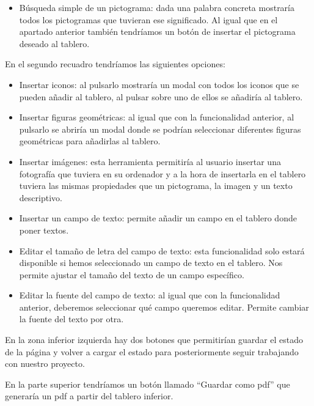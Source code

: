 \begin{itemize}
\begin{itemize}
		\item Búsqueda simple de un pictograma: dada una palabra concreta mostraría todos los pictogramas que tuvieran ese significado. Al igual que en el apartado anterior también tendríamos un botón de insertar el pictograma deseado al tablero.
	
	\end{itemize}

En el segundo recuadro tendríamos las siguientes opciones:

	\begin{itemize}
	
		\item Insertar iconos: al pulsarlo mostraría un modal con todos los iconos que se pueden añadir al tablero, al pulsar sobre uno de ellos se añadiría al tablero.
		
		\item Insertar figuras geométricas: al igual que con la funcionalidad anterior, al pulsarlo se abriría un modal donde se podrían seleccionar diferentes figuras geométricas para añadirlas al tablero.
		
		\item Insertar imágenes: esta herramienta permitiría al usuario insertar una fotografía que tuviera en su ordenador y a la hora de insertarla en el tablero tuviera las mismas propiedades que un pictograma, la imagen y un texto descriptivo.
		
		\item Insertar un campo de texto: permite añadir un campo en el tablero donde poner textos.
		
		\item Editar el tamaño de letra del campo de texto: esta funcionalidad solo estará disponible si hemos seleccionado un campo de texto en el tablero. Nos permite ajustar el tamaño del texto de un campo específico.
		
		\item Editar la fuente del campo de texto: al igual que con la funcionalidad anterior, deberemos seleccionar qué campo queremos editar. Permite cambiar la fuente del texto por otra.
		
	\end{itemize}
	
	
	En la zona inferior izquierda hay dos botones que permitirían guardar el estado de la página y volver a cargar el estado para posteriormente seguir trabajando con nuestro proyecto.
	
	En la parte superior tendríamos un botón llamado “Guardar como pdf” que generaría un pdf a partir del tablero inferior.
	

\end{itemize}
